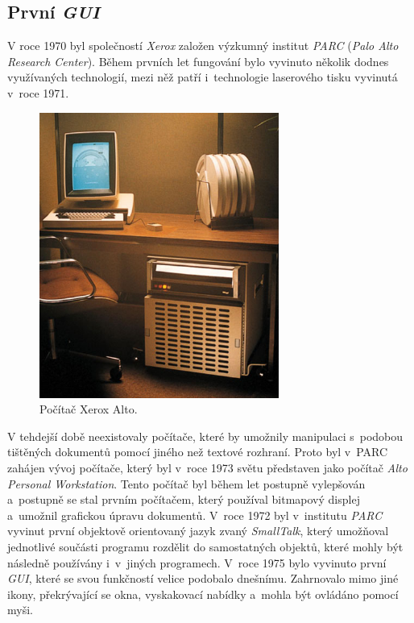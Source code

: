 \documentclass[11pt,twoside,a4paper]{book}
\begin{document}
\subsection{První \textit{GUI}}
V roce 1970 byl společností \textit{Xerox} založen výzkumný institut \textit{PARC} (\textit{Palo Alto Research Center}). Během prvních let fungování bylo vyvinuto několik dodnes využívaných technologií, mezi něž patří i~technologie laserového tisku vyvinutá v~roce 1971. 
\begin{figure}[!ht]
\begin{center}
  \includegraphics[width=0.7\textwidth]{XeroxAlto}
\caption{{\label{fig:alto}}Počítač Xerox Alto.}
\end{center}
\end{figure}
V tehdejší době neexistovaly počítače, které by umožnily manipulaci s~podobou tištěných dokumentů pomocí jiného než textové rozhraní. Proto byl v~PARC zahájen vývoj počítače, který byl v~roce 1973 světu představen jako počítač \textit{Alto Personal Workstation}. Tento počítač byl během let postupně vylepšován a~postupně se stal prvním počítačem, který používal bitmapový displej a~umožnil grafickou úpravu dokumentů. V~roce 1972 byl v~institutu \textit{PARC} vyvinut první objektově orientovaný jazyk zvaný \textit{SmallTalk}, který umožňoval jednotlivé součásti programu rozdělit do samostatných objektů, které mohly být následně používány i~v~jiných programech. V~roce 1975 bylo vyvinuto první \textit{GUI}, které se svou funkčností velice podobalo dnešnímu. Zahrnovalo mimo jiné ikony, překrývající se okna, vyskakovací nabídky a~mohla být ovládáno pomocí myši. \cite{bib:PARC}
\end{document}
